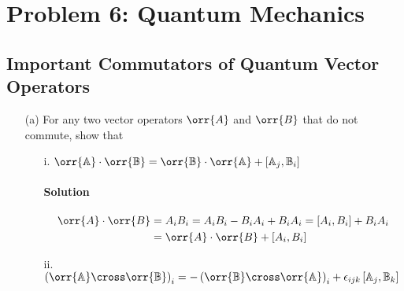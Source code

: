\documentclass{article}
\begin{document}
{%
%	
%		
	
	\section*{Problem 6: Quantum Mechanics}
	\subsection*{Important Commutators of Quantum Vector Operators}
	\boldmath
		\begin{enumerate}
			\item[(a)] For any two vector operators $\orr{A}$ and $\orr{B}$ that do not commute, show that \\ \begin{enumerate}
				\item[i.] $ \orr{\mathbb{A}} \cdot \orr{\mathbb{B}} = \orr{\mathbb{B}} \cdot \orr{\mathbb{A}} + \left[ \mathbb{A}_j , \mathbb{B}_i \right] $
				\paragraph{Solution} \unboldmath  
				\begin{equation*}
					\begin{split}
						\orr{A} \cdot \orr{B} &= A_i B_i = A_i B_i - B_i A_i + B_i A_i = \left[ A_i , B_i \right] + B_i A_i \\
						&= \orr{A} \cdot \orr{B} + \left[ A_i , B_i \right]
					\end{split}
				\end{equation*} \boldmath
				\item[ii.] $ \left( \orr{\mathbb{A}} \cross \orr{\mathbb{B}} \right)_i = - \left( \orr{\mathbb{B}} \cross \orr{\mathbb{A}} \right)_i + \epsilon_{ijk} \left[ \mathbb{A}_j , \mathbb{B}_k \right] $

\end{enumerate}
\end{enumerate}}
\end{document}
